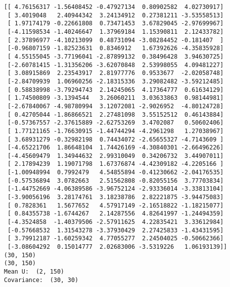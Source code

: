 \documentclass[11pt]{article}
\begin{document}
    \begin{Verbatim}[commandchars=\\\{\}]
[[ 4.76156317 -1.56408452 -0.47927134  0.80902582  4.02730917]
 [ 3.4019048   2.40944342  3.24134912  0.27381211 -3.53558513]
 [ 1.97174179 -0.22661808  0.73471453  3.67829045 -2.97699967]
 [-4.11598534 -1.40246647  1.37969184  1.15390811  2.12433782]
 [ 2.37896977 -4.10213099  0.48731094 -3.08284452 -0.181407  ]
 [-0.96807159 -1.82523631  0.8346912   1.67392626 -4.35835928]
 [ 4.55155045 -3.77196041 -2.87899132  0.38496428  3.94630725]
 [-2.60781415 -1.31356206 -3.62070848  2.53998055  4.09481227]
 [ 3.08915869  2.23543917  2.81977776  0.9533677  -2.02058748]
 [-2.84709939  1.06960256 -2.18315336  3.29082482 -3.59212485]
 [ 0.58838998 -3.79294743  2.14245065  4.17364777  0.61634129]
 [ 1.74500809 -3.1394544   3.26060211  3.03633863  0.98144981]
 [-2.67840067 -4.98780994  3.12072081 -2.9026952  -4.80124728]
 [ 0.42705044 -1.86866521  2.27481098  3.55152512  0.46143884]
 [-0.57367557 -2.37615889 -2.62753269  3.4702087   0.50602406]
 [ 1.77121165 -1.76630915 -1.44744294 -4.2961298   1.27038967]
 [ 3.68931279 -0.32982198  0.74434072 -2.65655327 -4.7143609 ]
 [-4.65221706  1.86648104  1.74426169 -4.30840301 -2.66496226]
 [-4.45609479  1.34944632  2.99310049  0.34206732  3.44907011]
 [ 2.17894239  1.19071798  1.67376874 -4.42309182 -4.2205166 ]
 [-1.00948994  0.7992479   4.54855894 -0.41230662 -2.04176535]
 [-0.57536894  3.0782663   2.51562808 -0.82055156  3.77703834]
 [-1.44752669 -4.06389586 -3.96752124 -2.93336014 -3.33813104]
 [-3.90056196  3.28174761  3.18238786  2.82221875 -3.94475083]
 [ 0.7828361   1.5677652   4.57917149 -2.16518822 -1.18215077]
 [ 0.84355738 -1.6744267   2.14287556  4.82641997 -1.24494359]
 [-4.3524858  -1.40379506 -2.57911625  4.22835421  3.33612984]
 [-0.57668532  1.31543278 -3.37930429  2.27425833 -1.43431595]
 [ 3.79912187 -1.60259342  4.77055277  2.24504025 -0.50662366]
 [-3.08604292  0.15014777  2.02683006 -3.5319226   1.06193139]]
(30, 150)
(30, 150)
Mean U:  (2, 150)
Covariance:  (30, 30)

    \end{Verbatim}
\end{document}
